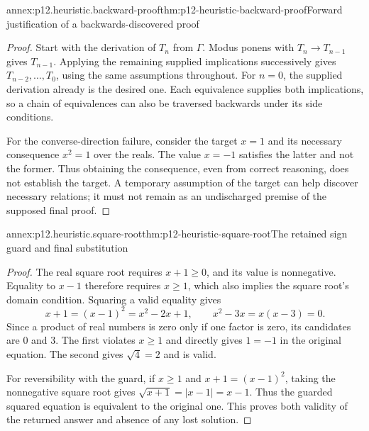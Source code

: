 \begin{annexitem}{annex:p12.heuristic.backward-proof}{thm:p12-heuristic-backward-proof}{Forward justification of a backwards-discovered proof}
\begin{proof}
Start with the derivation of \(T_n\) from \(\Gamma\).
Modus ponens with \(T_n\to T_{n-1}\) gives \(T_{n-1}\).
Applying the remaining supplied implications successively gives
\(T_{n-2},\ldots,T_0\), using the same assumptions throughout.
For \(n=0\), the supplied derivation already is the desired one.
Each equivalence supplies both implications, so a chain of
equivalences can also be traversed backwards under its side conditions.

For the converse-direction failure, consider the target \(x=1\)
and its necessary consequence \(x^2=1\) over the reals. The value
\(x=-1\) satisfies the latter and not the former. Thus obtaining
the consequence, even from correct reasoning, does not establish
the target. A temporary assumption of the target can help discover
necessary relations; it must not remain as an undischarged premise
of the supposed final proof.
\end{proof}
\end{annexitem}

\begin{annexitem}{annex:p12.heuristic.square-root}{thm:p12-heuristic-square-root}{The retained sign guard and final substitution}
\begin{proof}
The real square root requires \(x+1\ge0\), and its value is
nonnegative. Equality to \(x-1\) therefore requires \(x\ge1\),
which also implies the square root's domain condition. Squaring
a valid equality gives
\[
 x+1=(x-1)^2=x^2-2x+1,
 \qquad x^2-3x=x(x-3)=0.
\]
Since a product of real numbers is zero only if one factor is
zero, its candidates are \(0\) and \(3\). The first violates
\(x\ge1\) and directly gives \(1=-1\) in the original equation.
The second gives \(\sqrt4=2\) and is valid.

For reversibility with the guard, if \(x\ge1\) and
\(x+1=(x-1)^2\), taking the nonnegative square root gives
\(\sqrt{x+1}=|x-1|=x-1\). Thus the guarded squared equation
is equivalent to the original one. This proves both validity of
the returned answer and absence of any lost solution.
\end{proof}
\end{annexitem}

